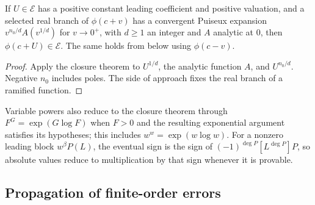 \begin{corollary}
If $U\in\mathcal E$ has a positive constant leading coefficient and positive valuation, and a selected real branch of $\phi(c+v)$ has a convergent Puiseux expansion $v^{n_0/d}A(v^{1/d})$ for $v\to0^+$, with $d\ge1$ an integer and $A$ analytic at $0$, then $\phi(c+U)\in\mathcal E$. The same holds from below using $\phi(c-v)$.
\end{corollary}
\begin{proof}
Apply the closure theorem to $U^{1/d}$, the analytic function $A$, and $U^{n_0/d}$. Negative $n_0$ includes poles. The side of approach fixes the real branch of a ramified function.
\end{proof}

Variable powers also reduce to the closure theorem through $F^G=\exp(G\log F)$ when $F>0$ and the resulting exponential argument satisfies its hypotheses; this includes $w^w=\exp(w\log w)$. For a nonzero leading block $w^\beta P(L)$, the eventual sign is the sign of $(-1)^{\deg P}[L^{\deg P}]P$, so absolute values reduce to multiplication by that sign whenever it is provable.

\subsection{Propagation of finite-order errors}
\label{sec:evaluator}

